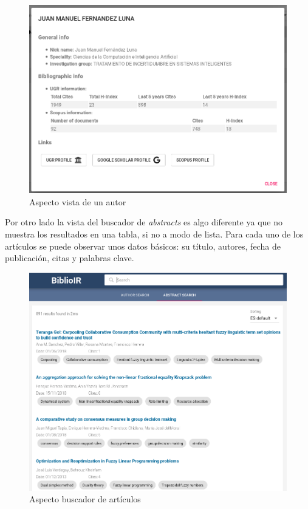 \begin{figure}[h]
	
	\centering
	\includegraphics[width=\linewidth]{imagenes/AspectoVistaAutor}
	\caption{Aspecto vista de un autor}
\end{figure}

\newpage

Por otro lado la vista del buscador de \textit{abstracts} es algo diferente ya que no muestra los resultados en una tabla, si no a modo de lista. Para cada uno de los artículos se puede observar unos datos básicos: su título, autores, fecha de publicación, citas y palabras clave.

\begin{figure}[h]
	
	\centering
	\includegraphics[width=\linewidth]{imagenes/AspectoBuscadorAbstracts}
	\caption{Aspecto buscador de artículos}
\end{figure}


